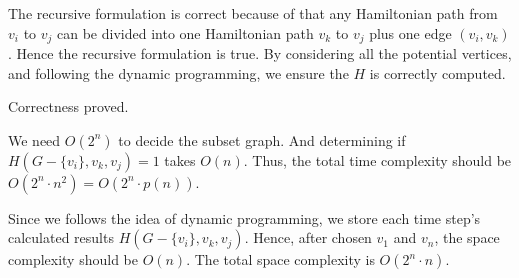 The recursive formulation is correct because of that any Hamiltonian path from $v_i$ to $v_j$ can be divided into one Hamiltonian path $v_k$ to $v_j$ plus one edge $(v_i, v_k)$. Hence the recursive formulation is true. By considering all the potential vertices, and following the dynamic programming, we ensure the $H$ is correctly computed. 

Correctness proved. 


We need $O(2^n)$ to decide the subset graph. And determining if $ H(G-\{v_i\}, v_k, v_j)=1$ takes $O(n)$. Thus, the total time complexity should be $O(2^n \cdot n^2)=O(2^n \cdot p(n))$.

Since we follows the idea of dynamic programming, we store each time step's calculated results $ H(G-\{v_i\}, v_k, v_j)$. Hence, after chosen $v_1$ and $v_n$, the space complexity should be $O(n)$. The total space complexity is $O(2^n \cdot n)$.


